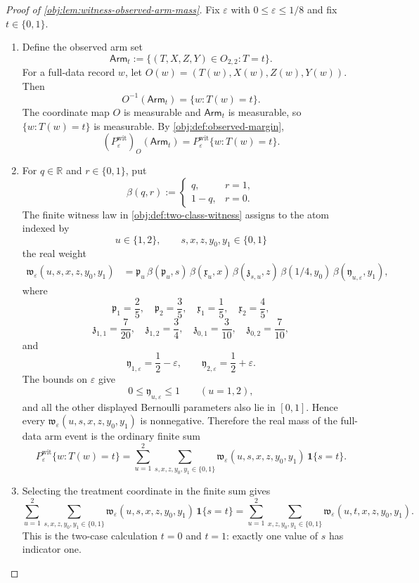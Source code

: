 \begin{proof}[Proof of \cref{obj:lem:witness-observed-arm-mass}]
Fix \(\varepsilon\) with \(0\le\varepsilon\le 1/8\) and fix \(t\in\{0,1\}\).

\begin{enumerate}
\item Define the observed arm set
\[
\mathsf{Arm}_t:=\{(T,X,Z,Y)\in O_{2,2}:T=t\}.
\]
For a full-data record \(w\), let \(O(w)=(T(w),X(w),Z(w),Y(w))\).  Then
\[
O^{-1}(\mathsf{Arm}_t)=\{w:T(w)=t\}.
\]
The coordinate map \(O\) is measurable and \(\mathsf{Arm}_t\) is measurable, so \(\{w:T(w)=t\}\) is measurable.  By \cref{obj:def:observed-margin},
\[
(P_{\varepsilon}^{\mathrm{wit}})_O(\mathsf{Arm}_t)
=
P_{\varepsilon}^{\mathrm{wit}}\{w:T(w)=t\}.
\]

\item For \(q\in\mathbb R\) and \(r\in\{0,1\}\), put
\[
\beta(q,r):=
\begin{cases}
q, & r=1,\\
1-q, & r=0.
\end{cases}
\]
The finite witness law in \cref{obj:def:two-class-witness} assigns to the atom indexed by
\[
u\in\{1,2\},
\qquad
s,x,z,y_0,y_1\in\{0,1\}
\]
the real weight
\[
\begin{aligned}
\mathfrak w_{\varepsilon}(u,s,x,z,y_0,y_1)
&=
\mathfrak p_u\,
\beta(\mathfrak p_u,s)\,
\beta(\mathfrak x_u,x)\,
\beta(\mathfrak z_{s,u},z)\,
\beta(1/4,y_0)\,
\beta(\mathfrak y_{u,\varepsilon},y_1),
\end{aligned}
\]
where
\[
\mathfrak p_1=\frac25,\quad
\mathfrak p_2=\frac35,\quad
\mathfrak x_1=\frac15,\quad
\mathfrak x_2=\frac45,
\]
\[
\mathfrak z_{1,1}=\frac7{20},\quad
\mathfrak z_{1,2}=\frac34,\quad
\mathfrak z_{0,1}=\frac3{10},\quad
\mathfrak z_{0,2}=\frac7{10},
\]
and
\[
\mathfrak y_{1,\varepsilon}=\frac12-\varepsilon,\qquad
\mathfrak y_{2,\varepsilon}=\frac12+\varepsilon .
\]
The bounds on \(\varepsilon\) give
\[
0\le \mathfrak y_{u,\varepsilon}\le 1\qquad (u=1,2),
\]
and all the other displayed Bernoulli parameters also lie in \([0,1]\).  Hence every
\(\mathfrak w_{\varepsilon}(u,s,x,z,y_0,y_1)\) is nonnegative.  Therefore the real mass of the full-data arm event is the ordinary finite sum
\[
P_{\varepsilon}^{\mathrm{wit}}\{w:T(w)=t\}
=
\sum_{u=1}^{2}
\sum_{s,x,z,y_0,y_1\in\{0,1\}}
\mathfrak w_{\varepsilon}(u,s,x,z,y_0,y_1)\,\mathbf 1\{s=t\}.
\]

\item Selecting the treatment coordinate in the finite sum gives
\[
\sum_{u=1}^{2}
\sum_{s,x,z,y_0,y_1\in\{0,1\}}
\mathfrak w_{\varepsilon}(u,s,x,z,y_0,y_1)\,\mathbf 1\{s=t\}
=
\sum_{u=1}^{2}
\sum_{x,z,y_0,y_1\in\{0,1\}}
\mathfrak w_{\varepsilon}(u,t,x,z,y_0,y_1).
\]
This is the two-case calculation \(t=0\) and \(t=1\): exactly one value of \(s\) has indicator one.


\end{enumerate}
\end{proof}
